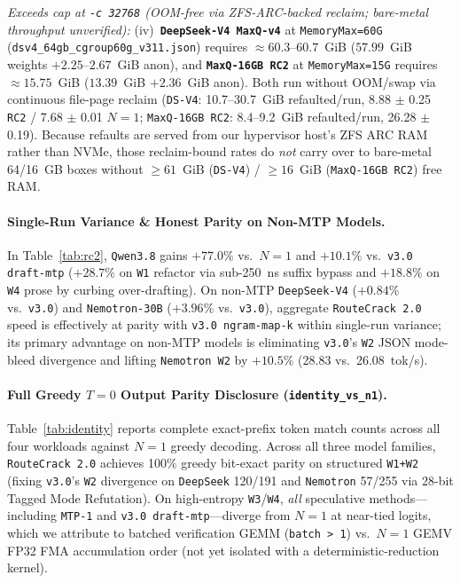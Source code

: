 \documentclass[10pt,twocolumn]{article}
\begin{document}
\emph{Exceeds cap at \texttt{-c 32768} (OOM-free via ZFS-ARC-backed reclaim; bare-metal throughput unverified):}
(iv)~\textbf{\texttt{DeepSeek-V4 MaxQ-v4}} at \texttt{MemoryMax=60G} (\texttt{dsv4\_64gb\_cgroup60g\_v311.json}) requires ${\approx}60.3$--$60.7$~GiB ($57.99$~GiB weights $+ 2.25$--$2.67$~GiB anon), and \textbf{\texttt{MaxQ-16GB RC2}} at \texttt{MemoryMax=15G} requires ${\approx}15.75$~GiB ($13.39$~GiB $+ 2.36$~GiB anon). Both run without OOM/swap via continuous file-page reclaim (\texttt{DS-V4}: 10.7--30.7~GiB refaulted/run, 8.88 $\pm$ 0.25 \texttt{RC2} / 7.68 $\pm$ 0.01 $N=1$; \texttt{MaxQ-16GB RC2}: 8.4--9.2~GiB refaulted/run, 26.28 $\pm$ 0.19). Because refaults are served from our hypervisor host's ZFS ARC RAM rather than NVMe, those reclaim-bound rates do \emph{not} carry over to bare-metal 64/16~GB boxes without $\ge 61$~GiB (\texttt{DS-V4}) / $\ge 16$~GiB (\texttt{MaxQ-16GB RC2}) free RAM.

\paragraph{Single-Run Variance \& Honest Parity on Non-MTP Models.}
In Table~\ref{tab:rc2}, \texttt{Qwen3.8} gains $+77.0\%$ vs.\ $N=1$ and $+10.1\%$ vs.\ \texttt{v3.0 draft-mtp} ($+28.7\%$ on \texttt{W1} refactor via sub-250~ns suffix bypass and $+18.8\%$ on \texttt{W4} prose by curbing over-drafting). On non-MTP \texttt{DeepSeek-V4} ($+0.84\%$ vs.\ \texttt{v3.0}) and \texttt{Nemotron-30B} ($+3.96\%$ vs.\ \texttt{v3.0}), aggregate \texttt{RouteCrack 2.0} speed is effectively at parity with \texttt{v3.0 ngram-map-k} within single-run variance; its primary advantage on non-MTP models is eliminating \texttt{v3.0}'s \texttt{W2} JSON mode-bleed divergence and lifting \texttt{Nemotron W2} by $+10.5\%$ (28.83 vs.\ 26.08~tok/s).

\paragraph{Full Greedy $T=0$ Output Parity Disclosure (\texttt{identity\_vs\_n1}).}
Table~\ref{tab:identity} reports complete exact-prefix token match counts across all four workloads against $N=1$ greedy decoding. Across all three model families, \texttt{RouteCrack 2.0} achieves 100\% greedy bit-exact parity on structured \texttt{W1+W2} (fixing \texttt{v3.0}'s \texttt{W2} divergence on \texttt{DeepSeek} 120/191 and \texttt{Nemotron} 57/255 via 28-bit Tagged Mode Refutation). On high-entropy \texttt{W3}/\texttt{W4}, \emph{all} speculative methods---including \texttt{MTP-1} and \texttt{v3.0 draft-mtp}---diverge from $N=1$ at near-tied logits, which we attribute to batched verification GEMM (\texttt{batch > 1}) vs.\ $N=1$ GEMV FP32 FMA accumulation order (not yet isolated with a deterministic-reduction kernel).
\end{document}
